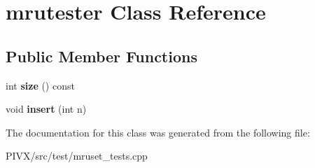 \hypertarget{classmrutester}{}\section{mrutester Class Reference}
\label{classmrutester}
\subsection*{Public Member Functions}
\begin{DoxyCompactItemize}
\item 
\mbox{\label{classmrutester_a3f2e7d14515f218653bb2731e5012248}} 
int {\bfseries size} () const
\item 
\mbox{\label{classmrutester_a381e816e8339dd46d2079eaca3643567}} 
void {\bfseries insert} (int n)
\end{DoxyCompactItemize}


The documentation for this class was generated from the following file\+:\begin{DoxyCompactItemize}
\item 
P\+I\+V\+X/src/test/mruset\+\_\+tests.\+cpp\end{DoxyCompactItemize}
